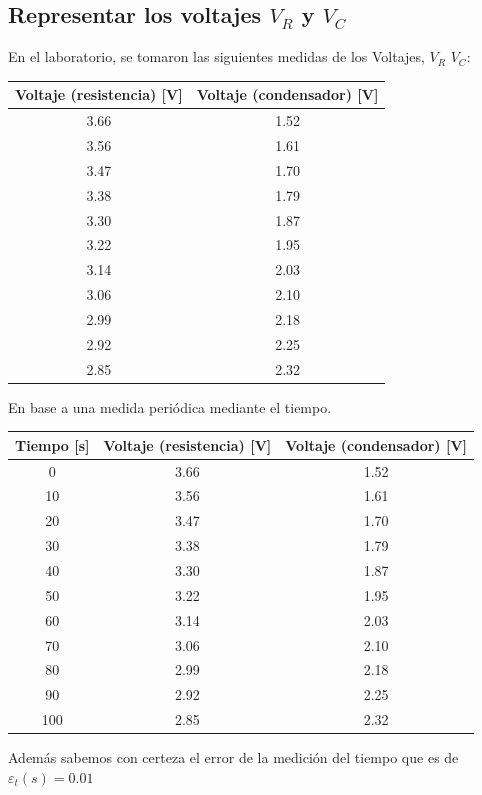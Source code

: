 \documentclass{article}
\begin{document}
\subsection{Representar los voltajes $V_R$ y $V_C$}
En el laboratorio, se tomaron las siguientes medidas de los Voltajes, $V_R$ $V_C$:
\begin{table}[H]
	\centering
	\begin{tabular}{|c|c|}
		\hline
		\textbf{Voltaje (resistencia) [V]} & \textbf{Voltaje (condensador) [V]} \\
		\hline
		3.66 & 1.52 \\
		3.56 & 1.61 \\
		3.47 & 1.70 \\
		3.38 & 1.79 \\
		3.30 & 1.87 \\
		3.22 & 1.95 \\
		3.14 & 2.03 \\
		3.06 & 2.10 \\
		2.99 & 2.18 \\
		2.92 & 2.25 \\
		2.85 & 2.32 \\
		\hline
	\end{tabular}
\end{table}
En base a una medida periódica mediante el tiempo.
\begin{table}[H]
	\centering
	\begin{tabular}{|c|c|c|}
		\hline
		\textbf{Tiempo [s]} & \textbf{Voltaje (resistencia) [V]} & \textbf{Voltaje (condensador) [V]} \\
		\hline
		0   & 3.66 & 1.52 \\
		10  & 3.56 & 1.61 \\
		20  & 3.47 & 1.70 \\
		30  & 3.38 & 1.79 \\
		40  & 3.30 & 1.87 \\
		50  & 3.22 & 1.95 \\
		60  & 3.14 & 2.03 \\
		70  & 3.06 & 2.10 \\
		80  & 2.99 & 2.18 \\
		90  & 2.92 & 2.25 \\
		100 & 2.85 & 2.32 \\
		\hline
	\end{tabular}
\end{table}
Además sabemos con certeza el error de la medición del tiempo que es de \(\varepsilon_t(s) = 0.01\)\vspace{2em}
\end{document}
